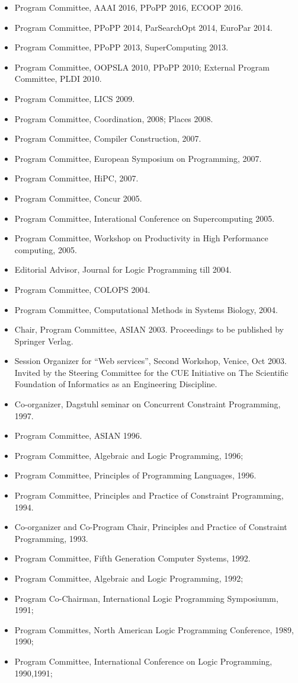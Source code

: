 \documentclass{article}
\begin{document}
\begin{itemize}
\item Program Committee, AAAI 2016, PPoPP 2016, ECOOP 2016.
\item Program Committee, PPoPP 2014, ParSearchOpt 2014, EuroPar 2014.
\item Program Committee, PPoPP 2013, SuperComputing 2013.
\item Program Committee, OOPSLA 2010, PPoPP 2010; External Program
  Committee, PLDI 2010.
\item Program Committee, LICS 2009.
\item Program Committee, Coordination, 2008; Places 2008.
\item Program Committee, Compiler Construction, 2007.
\item Program Committee, European Symposium on Programming, 2007.
\item Program Committee, HiPC, 2007.
\item Program Committee, Concur 2005.
\item Program Committee, Interational Conference on Supercomputing 2005.
 \item Program Committee, Workshop on Productivity in High Performance computing, 2005.
\item Editorial Advisor, Journal for Logic Programming till 2004.
 \item Program Committee, COLOPS 2004.
 \item Program Committee, Computational Methods in Systems Biology, 2004.
 \item Chair, Program Committee, ASIAN 2003. Proceedings to be
   published by Springer Verlag.
 \item Session Organizer for ``Web services'', Second Workshop,
   Venice, Oct 2003. Invited by the Steering Committee for the CUE
   Initiative on The Scientific Foundation of Informatics as an
   Engineering Discipline.
 \item Co-organizer, Dagstuhl seminar on Concurrent Constraint
   Programming, 1997.
 \item Program Committee, ASIAN 1996.
 \item Program Committee, Algebraic and Logic Programming, 1996; 
 \item Program Committee, Principles of Programming Languages,  1996.
 \item Program Committee, Principles and Practice of Constraint
   Programming, 1994.
 \item Co-organizer and Co-Program Chair, Principles and Practice of
   Constraint Programming, 1993.
 \item Program Committee, Fifth Generation Computer Systems, 1992.
 \item Program Committee, Algebraic and Logic Programming,  1992; 
 \item Program Co-Chairman, International  Logic Programming Symposiumm, 1991;
 \item Program Committes, North American Logic Programming
   Conference, 1989, 1990;
 \item Program Committee, International Conference on Logic
   Programming, 1990,1991;
\end{itemize}
\end{document}
